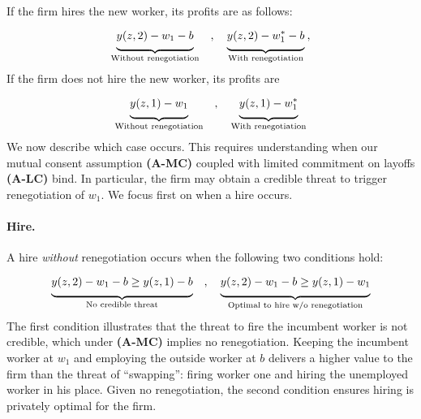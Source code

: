 If the firm hires the new worker, its profits are as follows:
\vspace{-.3cm}\begin{equation*}
\underbrace{\Big.
y(z,2)-w_{1}-b\Big.}_{\text{Without renegotiation}}\quad,\quad
\underbrace{\Big.
y(z,2)-w_{1}^{\ast }-b\Big.}_{\text{With renegotiation}}\:,
\vspace{-.3cm}\end{equation*}%
If the firm does not hire the new worker, its profits are
\vspace{-.3cm}\begin{equation*}
\underbrace{\Big.
y(z,1)-w_{1}\Big.}_{\text{Without renegotiation}}\quad,\quad
\underbrace{\Big.
y(z,1)-w_1^\ast\Big.}_{\text{With renegotiation}}
\vspace{-.3cm}\end{equation*}%
We now describe which case occurs.
This requires understanding when our mutual consent assumption \textbf{(A-MC)} coupled with limited commitment on layoffs \textbf{(A-LC)} bind. In particular, the firm may obtain a credible threat to trigger renegotiation of $w_1$. We focus first on when a hire occurs.

\vspace*{-.3cm}
\paragraph{Hire.}
A hire \emph{without} renegotiation occurs when the following two conditions hold:
\vspace*{-.3cm}\begin{equation}
\underbrace{\Big.
y(z,2) - w_1 - b \geq y(z,1) - b
\Big.}_{\text{No credible threat}}  \quad,\quad
\underbrace{\Big.
y(z,2) - w_1 - b \geq y(z,1) - w_1
\Big.}_{\text{Optimal to hire w/o renegotiation}}  \label{eq:S_hu_1}
\vspace*{-.3cm}\end{equation}
The first condition illustrates that the threat to fire the incumbent worker is not credible, which under \textbf{(A-MC)} implies no renegotiation. Keeping the incumbent worker at $w_{1}$ and employing the outside worker at $b$ delivers a higher value to the firm than the threat of ``swapping'':
firing worker one and hiring the unemployed worker in his place.
Given no renegotiation, the second condition ensures hiring is privately optimal for the firm.

